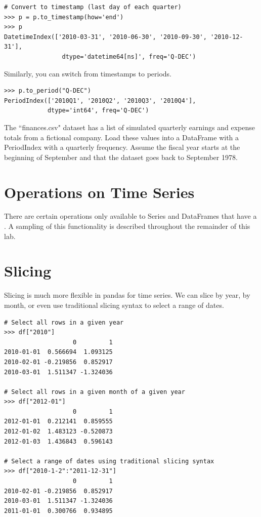 \begin{lstlisting}
# Convert to timestamp (last day of each quarter)
>>> p = p.to_timestamp(how='end')
>>> p
DatetimeIndex(['2010-03-31', '2010-06-30', '2010-09-30', '2010-12-31'],
                dtype='datetime64[ns]', freq='Q-DEC')

\end{lstlisting}

Similarly, you can switch from timestamps to periods.

\begin{lstlisting}
>>> p.to_period("Q-DEC")
PeriodIndex(['2010Q1', '2010Q2', '2010Q3', '2010Q4'],
            dtype='int64', freq='Q-DEC')

\end{lstlisting}

\begin{problem}
The ``finances.csv" dataset has a list of simulated quarterly earnings and expense totals from a fictional company. Load these values into a DataFrame with a PeriodIndex with a quarterly frequency. Assume the fiscal year starts at the beginning of September and that the dataset goes back to September 1978.
\end{problem}

\section*{Operations on Time Series}
There are certain operations only available to Series and DataFrames that have a . A sampling of this functionality is described throughout the remainder of this lab.

\section*{Slicing}
Slicing is much more flexible in pandas for time series. We can slice by year, by month, or even use traditional slicing syntax to select a range of dates.

\begin{lstlisting}
# Select all rows in a given year
>>> df["2010"]
                   0         1
2010-01-01  0.566694  1.093125
2010-02-01 -0.219856  0.852917
2010-03-01  1.511347 -1.324036

# Select all rows in a given month of a given year
>>> df["2012-01"]
                   0         1
2012-01-01  0.212141  0.859555
2012-01-02  1.483123 -0.520873
2012-01-03  1.436843  0.596143

# Select a range of dates using traditional slicing syntax
>>> df["2010-1-2":"2011-12-31"]
                   0         1
2010-02-01 -0.219856  0.852917
2010-03-01  1.511347 -1.324036
2011-01-01  0.300766  0.934895
\end{lstlisting}

